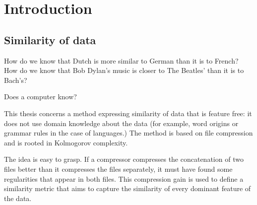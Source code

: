 
\chapter{Introduction} %

\label{Intro} %


\section{Similarity of data}

How do we know that Dutch is more similar to German than it is to French? How do we know that Bob Dylan's music is closer to The Beatles' than it is to Bach's?

Does a computer know? 

This thesis concerns a method expressing similarity of data that is feature free: it does not use domain knowledge about the data (for example, word origins or grammar rules in the case of languages.) The method is based on file compression and is rooted in Kolmogorov complexity.

The idea is easy to grasp. If a compressor compresses the concatenation of two files better than it compresses the files separately, it must have found some regularities that appear in both files. This compression gain is used to define a similarity metric that aims to capture the similarity of every dominant feature of the data.
